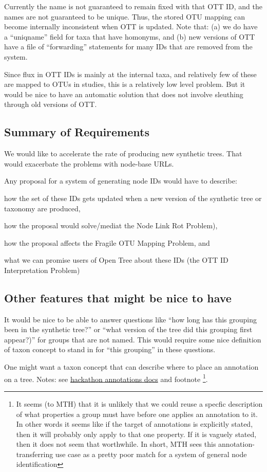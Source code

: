 \documentclass[11pt]{article}
\newcommand{\nodeLinkRot}{Node Link Rot Problem\xspace}
\newcommand{\ottIdInterpretation}{OTT ID Interpretation Problem\xspace}
\newcommand{\fragileOTUMapping}{Fragile OTU Mapping Problem\xspace}
\begin{document}
Currently the name is not guaranteed to remain fixed with that OTT ID, and the
  names are not guaranteed to be unique.
Thus, the stored OTU mapping can become internally inconsistent when OTT is updated.
Note that: (a) we do have a ``uniqname'' field for taxa that have homonyms, and (b)
  new versions of OTT have a file of ``forwarding'' statements for many IDs that 
  are removed from the system.

Since flux in OTT IDs is mainly at the internal taxa, and relatively few of these
  are mapped to OTUs in studies, this is a relatively low level problem.
But it would be nice to have an automatic solution that does not involve sleuthing
  through old versions of OTT.

\subsection{Summary of Requirements}
We would like to accelerate the rate of producing new synthetic trees.
That would exacerbate the problems with node-base URLs.

Any proposal for a system of generating node IDs would have to describe:
\begin{compactenum}
  \item how the
    set of these IDs gets updated when a new version of the synthetic tree or taxonomy are produced,
  \item how the proposal would solve/mediat the \nodeLinkRot), 
  \item how the proposal affects the \fragileOTUMapping, and
  \item what we can promise users of Open Tree about these IDs (the \ottIdInterpretation)
\end{compactenum}

\subsection{Other features that might be nice to have}
\begin{compactenum}
  \item It would be nice to be able to answer questions like ``how long has this grouping
been in the synthetic tree?'' or ``what version of the tree did this grouping first appear?)''
  for groups that are not named.
  This would require some nice definition of taxon concept to stand in for ``this grouping'' in these questions.
  \item One might want a taxon concept that can describe where to place an annotation on a tree.
  Notes: see \href{https://docs.google.com/document/d/1MbiQwy5ImaWUzzCudmkLwKj82oe-QC__e5krsQJ8umE/edit}{hackathon annotations docs} and footnote
  \footnote{
  It seems (to MTH) that it is unlikely that we could reuse a specfic description
    of what properties a group must have before one applies an annotation to it.
  In other words it seems like if the target of annotations is explicitly stated,
    then it will probably only apply to that one property.
  If it is vaguely stated, then it does not seem that worthwhile.
  In short, MTH sees this annotation-transferring use case as a pretty poor
    match for a system of general node identification}.
\end{compactenum}
\end{document}
